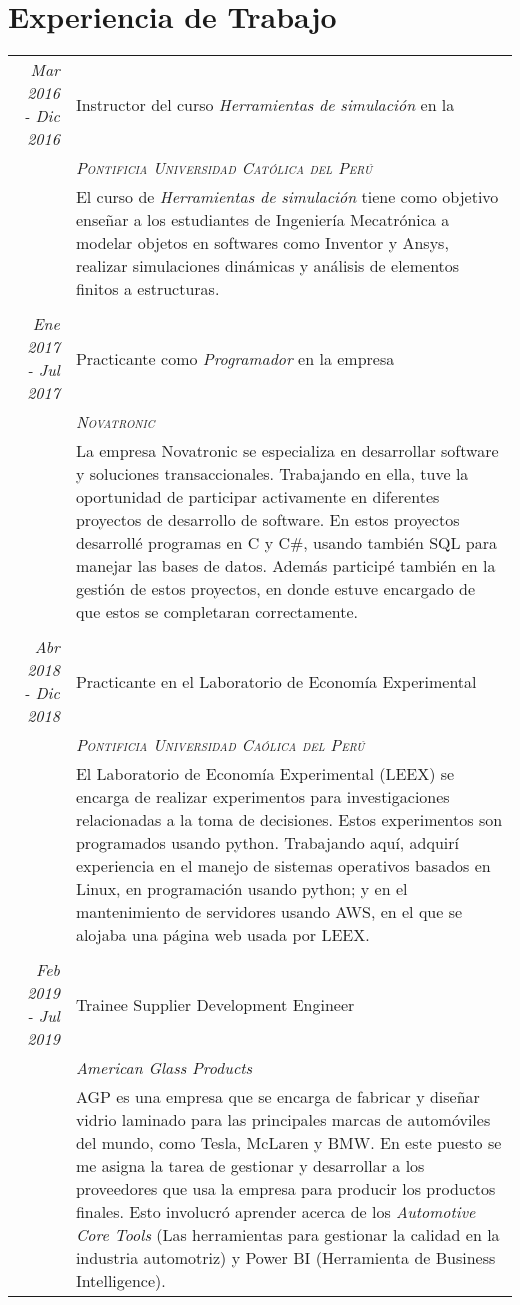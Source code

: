 \documentclass[a4paper,10pt]{article}
\newcommand{\workLogo}{\texttt{[image: Icons/work.png]}\hspace{3mm}}%
\begin{document}
\section{\raisebox{-.3\baselineskip}{\workLogo}Experiencia de Trabajo}
\begin{tabular}{r|p{11cm}}
 \emph{Mar 2016 - Dic 2016} & Instructor del curso \emph{Herramientas de simulación} en la \\&\emph{\textsc{Pontificia Universidad Católica del Per\'u}}\\&\footnotesize{El curso de \emph{Herramientas de simulación} tiene como objetivo enseñar a los estudiantes de Ingeniería Mecatrónica a modelar objetos en softwares como Inventor y Ansys, realizar simulaciones dinámicas y análisis de elementos finitos a estructuras.
 }\\&\\
  \emph{Ene 2017 - Jul 2017} & Practicante como  \emph{Programador} en la empresa \\&\emph{\textsc{Novatronic}}\\&\footnotesize{La empresa Novatronic se especializa en desarrollar software y soluciones transaccionales. Trabajando en ella, tuve la oportunidad de participar activamente en diferentes proyectos de desarrollo de software. En estos proyectos desarrollé programas en C y C\#, usando también SQL para manejar las bases de datos. Además participé también en la gestión de estos proyectos, en donde estuve encargado de que estos se completaran correctamente.}\\&\\
    \emph{Abr 2018 - Dic 2018} & Practicante en el Laboratorio de Economía Experimental \\&\emph{\textsc{Pontificia Universidad Caólica del Per\'u}}\\&\footnotesize{El Laboratorio de Economía Experimental (LEEX) se encarga de realizar experimentos para investigaciones relacionadas a la toma de decisiones. Estos experimentos son programados usando python. Trabajando aquí, adquirí experiencia en el manejo de sistemas operativos basados en Linux, en programación usando python; y en el mantenimiento de servidores usando AWS, en el que se alojaba una página web usada por LEEX.}\\&\\
    \emph{Feb 2019 - Jul 2019} & Trainee Supplier Development Engineer \\&\emph{American Glass Products}\\&\footnotesize{AGP es una empresa que se encarga de fabricar y diseñar vidrio laminado para las principales marcas de automóviles del mundo, como Tesla, McLaren y BMW. En este puesto se me asigna la tarea de gestionar y desarrollar a los proveedores que usa la empresa para producir  los productos finales. Esto involucró aprender acerca de los \emph{Automotive Core Tools} (Las herramientas para gestionar la calidad en la industria automotriz) y Power BI (Herramienta de Business Intelligence).}
\end{tabular}
\end{document}
